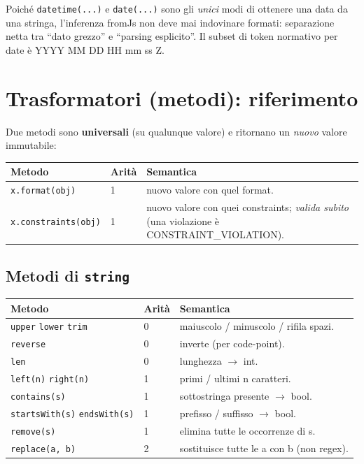 \documentclass[11pt,a4paper]{book}
\let\code\lstinline
\newcommand{\ic}[1]{{\ttfamily #1}}
\theoremstyle{definition}
\begin{document}
{{{{Poiché \code|datetime(...)| e \code|date(...)| sono gli \emph{unici} modi di
ottenere una data da una stringa, l'inferenza \ic{fromJs} non deve mai indovinare
formati: separazione netta tra ``dato grezzo'' e ``parsing esplicito''. Il subset
di token normativo per date è \ic{YYYY MM DD HH mm ss Z}.

\section{Trasformatori (metodi): riferimento}

Due metodi sono \textbf{universali} (su qualunque valore) e ritornano un
\emph{nuovo} valore immutabile:

\begin{center}
\small
\begin{tabular}{@{}l l p{7.4cm}@{}}
\toprule
\textbf{Metodo} & \textbf{Arità} & \textbf{Semantica} \\
\midrule
\code|x.format(obj)| & 1 & nuovo valore con quel \ic{format}. \\
\code|x.constraints(obj)| & 1 & nuovo valore con quei \ic{constraints}; \emph{valida
subito} (una violazione è \ic{CONSTRAINT\_VIOLATION}). \\
\bottomrule
\end{tabular}
\end{center}

\subsection{Metodi di \texttt{string}}

\begin{center}
\small
\begin{tabular}{@{}l l p{7.2cm}@{}}
\toprule
\textbf{Metodo} & \textbf{Arità} & \textbf{Semantica} \\
\midrule
\code|upper| \code|lower| \code|trim| & 0 & maiuscolo / minuscolo / rifila spazi. \\
\code|reverse| & 0 & inverte (per code-point). \\
\code|len| & 0 & lunghezza $\rightarrow$ \ic{int}. \\
\code|left(n)| \code|right(n)| & 1 & primi / ultimi \ic{n} caratteri. \\
\code|contains(s)| & 1 & sottostringa presente $\rightarrow$ \ic{bool}. \\
\code|startsWith(s)| \code|endsWith(s)| & 1 & prefisso / suffisso $\rightarrow$ \ic{bool}. \\
\code|remove(s)| & 1 & elimina tutte le occorrenze di \ic{s}. \\
\code|replace(a, b)| & 2 & sostituisce tutte le \ic{a} con \ic{b} (non regex). \\
\bottomrule
\end{tabular}
\end{center}

}}}}
\end{document}
